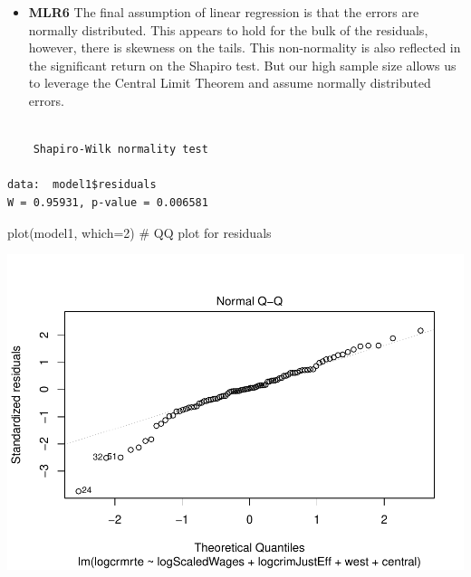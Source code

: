 \documentclass[]{article}
\newenvironment{Shaded}{}{}
\newcommand{\CommentTok}[1]{\textcolor[rgb]{0.00,0.50,0.00}{#1}}
\newcommand{\DataTypeTok}[1]{#1}
\newcommand{\DecValTok}[1]{#1}
\newcommand{\KeywordTok}[1]{\textcolor[rgb]{0.00,0.00,1.00}{#1}}
\newcommand{\NormalTok}[1]{#1}
\newcommand{\OperatorTok}[1]{#1}
\providecommand{\tightlist}{%
  \setlength{\itemsep}{0pt}\setlength{\parskip}{0pt}}
\begin{document}
\begin{itemize}
\tightlist
\item
  \textbf{MLR6} The final assumption of linear regression is that the
  errors are normally distributed. This appears to hold for the bulk of
  the residuals, however, there is skewness on the tails. This
  non-normality is also reflected in the significant return on the
  Shapiro test. But our high sample size allows us to leverage the
  Central Limit Theorem and assume normally distributed errors.
\end{itemize}

\begin{Shaded}
\end{Shaded}

\begin{verbatim}

    Shapiro-Wilk normality test

data:  model1$residuals
W = 0.95931, p-value = 0.006581
\end{verbatim}

\begin{Shaded}
\begin{Highlighting}[]
\KeywordTok{plot}\NormalTok{(model1, }\DataTypeTok{which=}\DecValTok{2}\NormalTok{) }\CommentTok{# QQ plot for residuals}
\end{Highlighting}
\end{Shaded}

\includegraphics{Bagnard_Gaustad_Hartman_Leung_Lab_3_files/figure-latex/unnamed-chunk-63-1.pdf}
\end{document}
